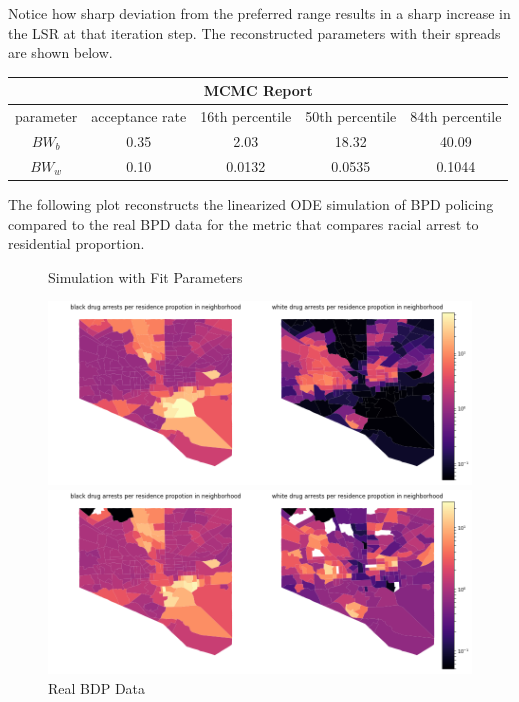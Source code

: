\documentclass[10pt]{article}
\begin{document}
Notice how sharp deviation from the preferred range results in a sharp increase in the LSR at that iteration step. The reconstructed parameters with their spreads are shown below. 
\begin{center}
\begin{tabular}{ |c||c|c|c|c|}
 \hline
 \multicolumn{5}{|c|}{MCMC Report} \\
 \hline
  parameter & acceptance rate & 16th percentile & 50th percentile & 84th percentile \\
  \hline
 \hline
 $BW_b$ & 0.35 & 2.03 & 18.32 & 40.09\\
 \hline
 $BW_w$ & 0.10 & 0.0132 & 0.0535 & 0.1044\\
 \hline
\end{tabular}
\end{center}
The following plot reconstructs the linearized ODE simulation of BPD policing compared to the real BPD data for the metric that compares racial arrest to residential proportion.
 \begin{figure}[!htb]
 \begin{minipage}{0.5\textwidth}
     \caption{Simulation with Fit Parameters}
     \centering
     \includegraphics[width=\textwidth]{mcmcmap.png}
   \end{minipage}\hfill
   \begin{minipage}{0.5\textwidth}
     \caption{Real BDP Data}
     \centering
     \includegraphics[width=\textwidth]{logdrugpop.png}
   \end{minipage}\hfill
 \end{figure}
 
\end{document}
